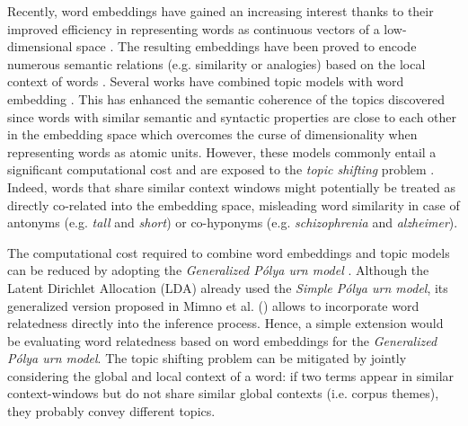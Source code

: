 \documentclass[letterpaper]{article}
\begin{document}
Recently, word embeddings have gained an increasing interest thanks to their improved efficiency in representing words as continuous vectors of a low-dimensional space \cite{Mikolov13a,Joulin16}. The resulting embeddings have been proved to encode numerous semantic relations (e.g. similarity or analogies) based on the local context of words \cite{Levy15}. Several works have combined topic models with word embedding \cite{nguyen2015improving,Li16}. This has enhanced the semantic coherence of the topics discovered since words with similar semantic and syntactic properties are close to each other in the embedding space which overcomes the curse of dimensionality when representing words as atomic units. However, these models commonly entail a significant computational cost and are exposed to the \textit{topic shifting} problem \cite{Rekabsaz17}. 
Indeed, words that share similar context windows might potentially be treated as directly co-related into the embedding space, misleading word similarity in case of antonyms (e.g. \textit{tall} and \textit{short}) or co-hyponyms (e.g. \textit{schizophrenia} and \textit{alzheimer}). 

The computational cost required to combine word embeddings and topic models can be reduced by adopting the \textit{Generalized P\'{o}lya urn model} \cite{Mahmoud08}. Although the Latent Dirichlet Allocation (LDA) \cite{Blei03} already used the \textit{Simple P\'{o}lya urn model}, its generalized version proposed in Mimno et al. (\citeyear{Mimno11}) allows to incorporate word relatedness directly into the inference process. Hence, a simple extension would be evaluating word relatedness based on word embeddings for the \textit{Generalized P\'{o}lya urn model}. %
The topic shifting problem can be mitigated by jointly considering the global and local context of a word: if two terms appear in similar context-windows but do not share similar global contexts (i.e. corpus themes), they probably convey different topics. %
\end{document}
